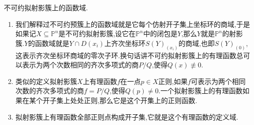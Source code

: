 不可约拟射影簇上的函数域.
\begin{enumerate}
	\item 我们解释过不可约预簇上的函数域就是它每个仿射开子集上坐标环的商域,于是如果记$X\subseteq\mathbb{P}^n$是不可约拟射影簇,设它在$\mathbb{P}^n$中的闭包是$Y$,那么$Y$就是$\mathbb{P}^n$的射影簇.$Y$的函数域就是$Y\cap D(x_i)$上齐次坐标环$S(Y)_{(x_i)}$的商域,也即$S(Y)_{(0)}$,这表示齐次坐标环商域的零次子环.换句话讲不可约拟射影簇上的有理函数总可以表示为两个次数相同的齐次多项式的商$P/Q$,使得$Q(x)\not\equiv0$.
	\item 类似的定义拟射影簇$X$上有理函数$f$在一点$p\in X$正则,如果$f$可表示为两个相同次数的齐次多项式的商$f=P/Q$,使得$Q(p)\not=0$.一个拟射影簇上的有理函数如果在某个开子集上处处正则,那么它是这个开集上的正则函数.
	\item 拟射影簇上有理函数全部正则点构成开子集,它就是这个有理函数的定义域.
\end{enumerate}

